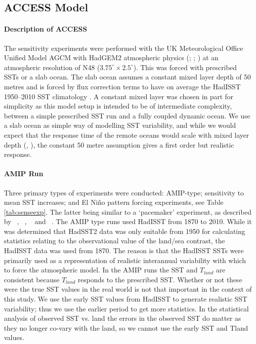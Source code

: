 
\subsection{ACCESS Model}

\paragraph{Description of ACCESS}
The sensitivity experiments were performed with the UK Meteorological Office 
Unified Model AGCM with HadGEM2 atmospheric physics (\citet{Davies2005}; 
\citet{Martin2010}; \citet{Bellouin2011}) at an atmospheric resolution of N48 
($3.75^{\circ} \times 
2.5^{\circ}$). This was forced with prescribed SSTs or a slab ocean. The slab
ocean assumes a constant mixed layer depth of 50 metres and is forced by flux 
correction terms to have on average the HadISST 1950--2010 SST climatology 
\citep{Wang2014}. A constant mixed layer was chosen in part for simplicity as 
this model setup is intended to be of intermediate complexity, between a simple 
prescribed SST run and a fully coupled dynamic ocean. We use a slab ocean as 
simple way of modelling SST variability, and while we would expect that the 
response time of the remote oceans would scale with mixed layer depth 
(\citealt{Su2005a}, \citealt{Lintner2007}), the constant 
50 metre assumption gives a first order but realistic response.

\paragraph{AMIP Run}
Three primary types of experiments were conducted: AMIP-type; sensitivity to 
mean SST increases; and El Ni{\~n}o pattern forcing experiments, see Table 
\ref{tab:senseexp}. The latter being similar to a `pacemaker' experiment, as 
described by ~\citealt{Alexander1992}, ~\citealt{Alexander1992a}, 
~\citealt{Lau2000} and ~\citealt{Lu2011}. The AMIP type runs used HadISST from 
1870 to 2010. While it was determined that HadSST2 data was only suitable
from 1950 for calculating statistics relating to the observational value of the 
land/sea contrast, the HadISST data was used from 1870. The reason is that the 
HadISST SSTs were primarily used as a representation of realistic interannual 
variability with which to force the atmospheric model.  In the AMIP runs the SST 
and $T_{land}$ are consistent because $T_{land}$ responds to the prescribed SST.  
Whether or not these were the true SST values in the real world is not that 
important in the context of this study.  We use the early SST values from 
HadISST to generate realistic SST variability; thus we use the earlier period to 
get more statistics. In the statistical analysis of observed SST vs. land the 
errors in the observed SST do matter as they no longer co-vary with the land, so 
we cannot use the early SST and Tland values. 

